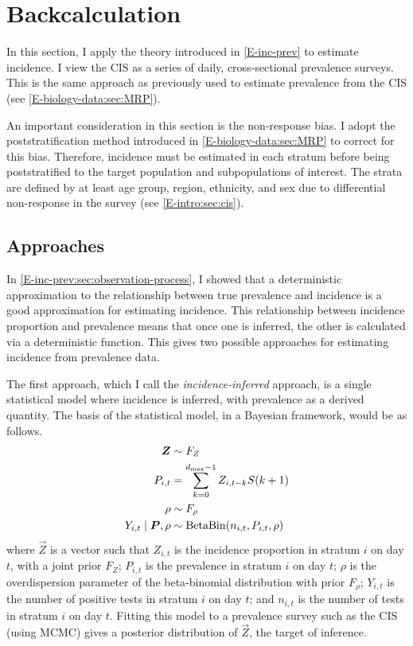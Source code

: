 \documentclass[thesis.tex]{subfiles}
\begin{document}
\section{Backcalculation} \label{backcalc}

In this section, I apply the theory introduced in \cref{E-inc-prev} to estimate incidence.
I view the CIS as a series of daily, cross-sectional prevalence surveys.
This is the same approach as previously used to estimate prevalence from the CIS (see \cref{E-biology-data:sec:MRP}).

An important consideration in this section is the non-response bias.
I adopt the poststratification method introduced in \cref{E-biology-data:sec:MRP} to correct for this bias.
Therefore, incidence must be estimated in each stratum before being poststratified to the target population and subpopulations of interest.
The strata are defined by at least age group, region, ethnicity, and sex due to differential non-response in the survey (see \cref{E-intro:sec:cis}).

\subsection{Approaches} \label{backcalc:sec:approach}

In \cref{E-inc-prev:sec:observation-process}, I showed that a deterministic approximation to the relationship between true prevalence and incidence is a good approximation for estimating incidence.
This relationship between incidence proportion and prevalence means that once one is inferred, the other is calculated via a deterministic function.
This gives two possible approaches for estimating incidence from prevalence data.


The first approach, which I call the \emph{incidence-inferred} approach, is a single statistical model where incidence is inferred, with prevalence as a derived quantity.
The basis of the statistical model, in a Bayesian framework, would be as follows.
\begin{align}
    \bm{Z} &\sim F_Z \\
    P_{i,t}  &= \sum_{k=0}^{d_\text{max}-1} Z_{i,t-k} S(k+1) \\
    \rho &\sim F_\rho \\
    Y_{i,t} \mid \bm{P}, \rho &\sim \operatorname{BetaBin}(n_{i,t}, P_{i,t}, \rho)
\end{align}
where $\vec{Z}$ is a vector such that $Z_{i,t}$ is the incidence proportion in stratum $i$ on day $t$, with a joint prior $F_Z$; $P_{i,t}$ is the prevalence in stratum $i$ on day $t$; $\rho$ is the overdispersion parameter of the beta-binomial distribution with prior $F_\rho$; $Y_{i,t}$ is the number of positive tests in stratum $i$ on day $t$; and $n_{i,t}$ is the number of tests in stratum $i$ on day $t$.
Fitting this model to a prevalence survey such as the CIS (\eg using MCMC) gives a posterior distribution of $\vec{Z}$, the target of inference.
\end{document}

